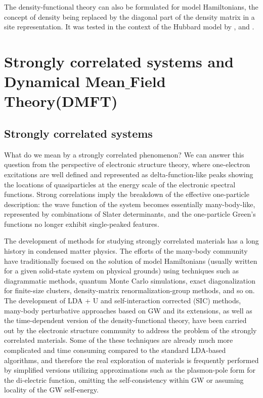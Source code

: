 \documentclass[12 pt]{article}
\begin{document}
{  The density-functional theory can also be formulated for model Hamiltonians, the concept of density being replaced 
by the diagonal part of the density matrix in a site representation. It was tested in the context of the Hubbard 
model by , and . \citep {Kotliar2006}

    \newpage 
    \section{\textbf{Strongly correlated systems and\\ Dynamical Mean$\_$Field Theory(DMFT)}} \label{sec:DMFT}
      \subsection{Strongly correlated systems}\label{subsec:strongly correlated}

  What do we mean by a strongly correlated phenomenon? We can answer this question from the perspective of electronic 
structure theory, where one-electron excitations are well defined and represented as delta-function-like peaks showing 
the locations of quasiparticles at the energy scale of the electronic spectral functions. Strong correlations 
imply the breakdown of the effective one-particle description: the wave function of the system becomes essentially 
many-body-like, represented by combinations of Slater determinants, and the one-particle Green's functions no longer 
exhibit single-peaked features. 

  The development of methods for studying strongly correlated materials has a long history in condensed matter physics. 
The efforts of the many-body community have traditionally focused on the solution of model Hamiltonians (usually 
written for a given solid-state system on physical grounds) using techniques such as diagrammatic methods, quantum 
Monte Carlo simulations, exact diagonalization for finite-size clusters, density-matrix renormalization-group methods, 
and so on. The development of LDA + U and self-interaction corrected (SIC) methods, many-body perturbative approaches 
based on GW and its extensions, as well as the time-dependent version of the density-functional theory, have been 
carried out by the electronic structure community to address the problem of the strongly correlated materials. 
Some of the these techniques are already much more complicated and time consuming compared to the standard LDA-based 
algorithms, and therefore the real exploration of materials is frequently performed by simplified versions utilizing 
approximations such as the plasmon-pole form for the di-electric function, omitting the self-consistency within GW 
or assuming locality of the GW self-energy. 

}
\end{document}
